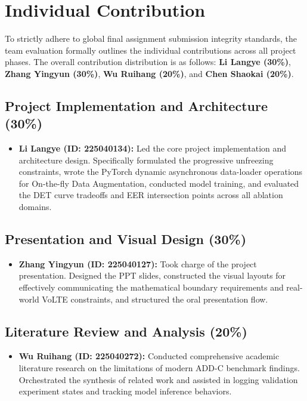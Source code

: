 \documentclass[10pt, twocolumn]{article}
\begin{document}



\clearpage
\appendix

\section{Individual Contribution}

To strictly adhere to global final assignment submission integrity standards, the team evaluation formally outlines the individual contributions across all project phases. The overall contribution distribution is as follows: \textbf{Li Langye (30\%)}, \textbf{Zhang Yingyun (30\%)}, \textbf{Wu Ruihang (20\%)}, and \textbf{Chen Shaokai (20\%)}.

\subsection*{Project Implementation and Architecture (30\%)}
\begin{itemize}
\item \textbf{Li Langye (ID: 225040134):} Led the core project implementation and architecture design. Specifically formulated the progressive unfreezing constraints, wrote the PyTorch dynamic asynchronous data-loader operations for On-the-fly Data Augmentation, conducted model training, and evaluated the DET curve tradeoffs and EER intersection points across all ablation domains.
\end{itemize}

\subsection*{Presentation and Visual Design (30\%)}
\begin{itemize}
\item \textbf{Zhang Yingyun (ID: 225040127):} Took charge of the project presentation. Designed the PPT slides, constructed the visual layouts for effectively communicating the mathematical boundary requirements and real-world VoLTE constraints, and structured the oral presentation flow.
\end{itemize}

\subsection*{Literature Review and Analysis (20\%)}
\begin{itemize}
\item \textbf{Wu Ruihang (ID: 225040272):} Conducted comprehensive academic literature research on the limitations of modern ADD-C benchmark findings. Orchestrated the synthesis of related work and assisted in logging validation experiment states and tracking model inference behaviors.
\end{itemize}
\end{document}
